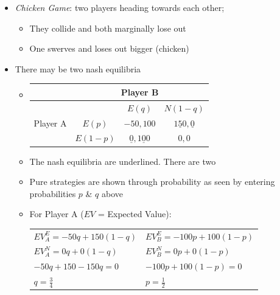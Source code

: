 \documentclass[11pt, english]{article}
\begin{document}
	\begin{itemize}
	\setlength\itemsep{0cm}
		\item \textit{Chicken Game}: two players heading towards each other;
		\begin{itemize}
			\item They collide and both marginally lose out
			\item One swerves and loses out bigger (chicken)
		\end{itemize}
		\item There may be two nash equilibria
		\begin{itemize}
			\item 
				\begin{table}[h]
					\scriptsize
					\renewcommand{\arraystretch}{1.25}
				\begin{center}
				\begin{tabular}{|c|c|c|c|}
					\hline
					& \multicolumn{3}{|c|}{Player B}\\
					\hline
					\multirow{3}{*}{Player A} & & $E(q)$ & $N(1-q)$\\
					\cline{2-4}
					& $E(p)$ & $-50,100$ & $\underline{150},\underline{0}$\\
					\cline{2-4}
					& $E(1-p)$ & $\underline{0},\underline{100}$ & $0,0$\\
					\hline
				\end{tabular}
				\end{center}
				\end{table}
			\item The nash equilibria are underlined. There are two
			\item Pure strategies are shown through probability as seen by entering probabilities $p$ \& $q$ above
			\item For Player A ($EV$ = Expected Value):
				\begin{table}[h]
                                        \renewcommand{\arraystretch}{1.25}
				\begin{center}
				\begin{tabular}{l|l}
					$EV_A^E=-50q+150(1-q)$ & $EV_B^E=-100p+100(1-p)$\\
					$EV_A^N=0q+0(1-q)$ & $EV_B^N=0p+0(1-p)$\\
					$-50q+150-150q=0$ & $-100p+100(1-p)=0$\\
					\underline{$q=\frac{3}{4}$} & \underline{$p=\frac{1}{2}$}\\
				\end{tabular}
				\end{center}

\end{table}
\end{itemize}
\end{itemize}
\end{document}
